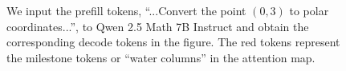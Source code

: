 \begin{figure}[ht]
\vskip -0.1in
\begin{center}
\caption{We input the prefill tokens, ``...Convert the point $(0,3)$ to polar coordinates...'', to Qwen 2.5 Math 7B Instruct and obtain the corresponding decode tokens in the figure. The red tokens represent the milestone tokens or ``water columns'' in the attention map.}
\label{fig-algo-milestone}
\end{center}
\vskip -0.3in
\end{figure}